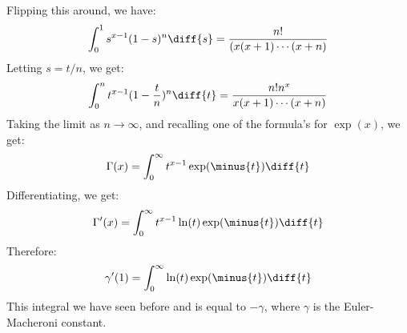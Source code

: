 \documentclass[crop=false,class=book,oneside]{standalone}
\begin{document}
        Flipping this around, we have:
        \begin{equation}
            \int_{0}^{1}s^{x-1}(1-s)^{n}\diff{s}
            =\frac{n!}{(x(x+1)\cdots(x+n)}
        \end{equation}
        Letting $s=t/n$, we get:
        \begin{equation}
            \int_{0}^{n}t^{x-1}(1-\frac{t}{n})^{n}\diff{t}=
            \frac{n!n^{x}}{x(x+1)\cdots(x+n)}
        \end{equation}
        Taking the limit as $n\rightarrow\infty$, and recalling one of the formula's
        for $\exp(x)$, we get:
        \begin{equation}
            \Gamma(x)=\int_{0}^{\infty}t^{x-1}\exp(\minus{t})\diff{t}
        \end{equation}
        Differentiating, we get:
        \begin{equation}
            \Gamma'(x)=
            \int_{0}^{\infty}t^{x-1}\ln(t)\exp(\minus{t})\diff{t}
        \end{equation}
        Therefore:
        \begin{equation}
            \gamma'(1)=\int_{0}^{\infty}\ln(t)\exp(\minus{t})\diff{t}
        \end{equation}
        This integral we have seen before and is equal to $\minus\gamma$, where
        $\gamma$ is the Euler-Macheroni constant.
\end{document}
